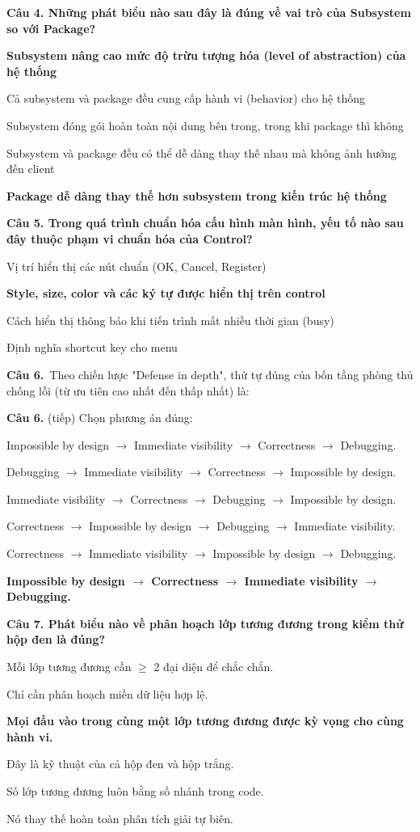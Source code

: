 \documentclass[11pt,a4paper]{article}
\newenvironment{pa}
  {\begin{list}{}{\leftmargin=0.95cm\labelwidth=0.5cm\labelsep=0.3cm
     \itemsep=0pt\parsep=0pt\topsep=0pt\partopsep=0pt}}
  {\end{list}}
\newcommand{\A}{\item[A.]}
\newcommand{\B}{\item[B.]}
\newcommand{\C}{\item[C.]}
\newcommand{\D}{\item[D.]}
\newcommand{\E}{\item[E.]}
\newcommand{\F}{\item[F.]}
\begin{document}
\par\noindent\textbf{Câu 4. Những phát biểu nào sau đây là đúng về vai trò của Subsystem so với Package?}
\begin{pa}
  \A {\bfseries Subsystem nâng cao mức độ trừu tượng hóa (level of abstraction) của hệ thống}
  \B Cả subsystem và package đều cung cấp hành vi (behavior) cho hệ thống
  \C Subsystem đóng gói hoàn toàn nội dung bên trong, trong khi package thì không
  \D Subsystem và package đều có thể dễ dàng thay thế nhau mà không ảnh hưởng đến client
  \E {\bfseries Package dễ dàng thay thế hơn subsystem trong kiến trúc hệ thống}
\end{pa}

\par\noindent\textbf{Câu 5. Trong quá trình chuẩn hóa cấu hình màn hình, yếu tố nào sau đây thuộc phạm vi chuẩn hóa của Control?}
\begin{pa}
  \A Vị trí hiển thị các nút chuẩn (OK, Cancel, Register)
  \B {\bfseries Style, size, color và các ký tự được hiển thị trên control}
  \C Cách hiển thị thông báo khi tiến trình mất nhiều thời gian (busy)
  \D Định nghĩa shortcut key cho menu
\end{pa}

\par\noindent\textbf{Câu 6.}~Theo chiến lược "Defense in depth", thứ tự đúng của bốn tầng phòng thủ chống lỗi (từ ưu tiên cao nhất đến thấp nhất) là:

\newpage
{\bfseries Câu 6.} (tiếp) Chọn phương án đúng:
\begin{pa}
  \item[A.] Impossible by design $\rightarrow$ Immediate visibility $\rightarrow$ Correctness $\rightarrow$ Debugging.
  \item[B.] Debugging $\rightarrow$ Immediate visibility $\rightarrow$ Correctness $\rightarrow$ Impossible by design.
  \item[C.] Immediate visibility $\rightarrow$ Correctness $\rightarrow$ Debugging $\rightarrow$ Impossible by design.
  \item[D.] Correctness $\rightarrow$ Impossible by design $\rightarrow$ Debugging $\rightarrow$ Immediate visibility.
  \item[E.] Correctness $\rightarrow$ Immediate visibility $\rightarrow$ Impossible by design $\rightarrow$ Debugging.
  \item[F.] {\bfseries Impossible by design $\rightarrow$ Correctness $\rightarrow$ Immediate visibility $\rightarrow$ Debugging.}
\end{pa}
\par\noindent\textbf{Câu 7. Phát biểu nào về phân hoạch lớp tương đương trong kiểm thử hộp đen là đúng?}
\begin{pa}
  \A Mỗi lớp tương đương cần $\ge$ 2 đại diện để chắc chắn.
  \B Chỉ cần phân hoạch miền dữ liệu hợp lệ.
  \C {\bfseries Mọi đầu vào trong cùng một lớp tương đương được kỳ vọng cho cùng hành vi.}
  \D Đây là kỹ thuật của cả hộp đen và hộp trắng.
  \E Số lớp tương đương luôn bằng số nhánh trong code.
  \F Nó thay thế hoàn toàn phân tích giải tự biên.
\end{pa}
\end{document}
